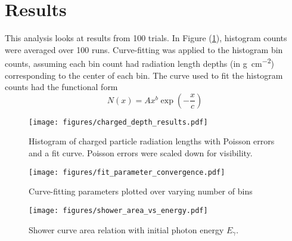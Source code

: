 \documentclass{article}
\newcommand{\radlen}{\gram\per\cm^2}
\begin{document}
\subsection{} %
\label{sub:}


\section{Results} %
\label{sec:Results}

\iffalse
\begin{figure}[htpb]
    \begin{center}
        \texttt{[image: figures/charged\_depth\_hist.pdf]}
    \end{center}
    \caption{Histogram of charged particle radiation lengths}\label{fig:hist}
\end{figure}
\fi

This analysis looks at results from 100 trials. In Figure (\ref{fig:results}), histogram counts were averaged over 100 runs. Curve-fitting was applied to the histogram bin counts, assuming each bin count had radiation length depths (in \unit{\radlen}) corresponding to the center of each bin. The curve used to fit the histogram counts had the functional form
\begin{equation}
    N(x) = A x^b \exp \left(-\frac{x}{c}\right)
\end{equation}

\begin{figure}[htpb]
    \begin{center}
        \texttt{[image: figures/charged\_depth\_results.pdf]}
    \end{center}
    \caption{Histogram of charged particle radiation lengths with Poisson errors and a fit curve. Poisson errors were scaled down for visibility.}\label{fig:results}
\end{figure}

\begin{figure}
    \begin{center}
        \texttt{[image: figures/fit\_parameter\_convergence.pdf]}
    \end{center}
    \caption{Curve-fitting parameters plotted over varying number of bins}\label{fig:convergence}
\end{figure}

\begin{figure}
    \begin{center}
        \texttt{[image: figures/shower\_area\_vs\_energy.pdf]}
    \end{center}
    \caption{Shower curve area relation with initial photon energy \( E_\gamma \).}\label{fig:shower-area}
\end{figure}
\end{document}
